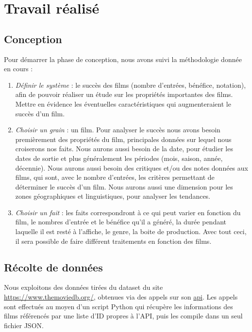\chapter{Travail réalisé}

\section{Conception}
Pour démarrer la phase de conception, nous avons suivi la méthodologie donnée en cours :
\begin{enumerate}
\item \emph{Définir le système} : le succès des films (nombre d'entrées, bénéfice, notation), afin de pouvoir réaliser un étude sur les propriétés importantes des films. Mettre en évidence les éventuelles caractéristiques qui augmenteraient le succès d’un film. 
	
\item \emph{Choisir un grain} : un film.
Pour analyser le succès nous avons besoin premièrement des propriétés du film, principales données sur lequel nous croiserons nos faits. Nous aurons aussi besoin de la date, pour étudier les dates de sortie et plus généralement les périodes (mois, saison, année, décennie). Nous aurons aussi besoin des critiques et/ou des notes données aux films, qui sont, avec le nombre d’entrées, les critères permettant de déterminer le succès d’un film. Nous aurons aussi une dimension pour les zones géographiques et linguistiques, pour analyser les tendances.

\item \emph{Choisir un fait} : les faits correspondront à ce qui peut varier en fonction du film, le nombres d'entrée et le bénéfice qu’il a généré, la durée pendant laquelle il est resté à l'affiche, le genre, la boite de production. Avec tout ceci, il sera possible de faire différent traitements en fonction des films.
\end{enumerate} 

\section{Récolte de données}

Nous exploitons des données tirées du dataset du site \url{https://www.themoviedb.org/}, obtenues via des appels sur son \href{https://www.themoviedb.org/documentation/api}{api}. Les appels sont effectués au moyen d'un script Python qui récupère les informations des films référencés par une liste d'ID propres à l'API, puis les compile dans un seul fichier JSON.


